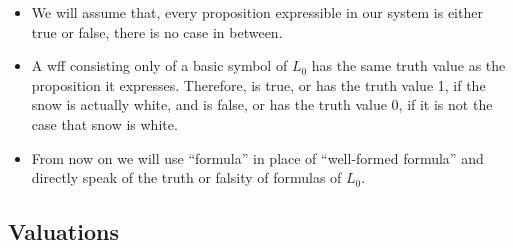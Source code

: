 \documentclass[11pt]{article}
\begin{document}
\begin{itemize}
\item We will assume that, every proposition expressible in our system is either
true or false, there is no case in between.

\item A wff consisting only of a basic symbol of $L_0$ has the same truth
value as the proposition it expresses. Therefore,  is true, or has the
truth value 1, if the snow is actually white, and is false, or has the truth
value 0, if it is not the case that snow is white.

\item From now on we will use ``formula'' in place of ``well-formed formula''
and directly speak of the truth or falsity of formulas of $L_0$.
\end{itemize}

\subsection{Valuations}
\end{document}
